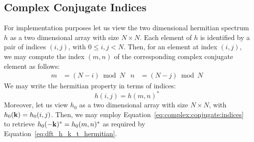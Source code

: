 \subsection{Complex Conjugate Indices}
%
For implementation purposes let us view the two dimensional hermitian spectrum $h$
as a two dimensional array with size $N \times N$.
Each element of $h$ is identified by a pair of indices $(i,j)$, with $0\leq i,j <N$. Then, for
an element at index $(i,j)$, we may compute the index $(m,n)$ of the corresponding complex
conjugate element as follows:
\begin{align}
\label{eq:complex:conjugate:indices}
m &= (N - i)\bmod N & n &= (N - j)\bmod N
\end{align}
We may write the hermitian property in terms of indices:
\begin{equation*}
 h(i,j) = h(m,n)^*
\end{equation*}
%
Moreover, let us view $h_0$ as a two dimensional array with size $N \times N$,
with $h_0(\mathbf{k}) = h_0(i,j)$. Then, we may employ Equation~\ref{eq:complex:conjugate:indices}
to retrieve $h_0(-\mathbf{k})^*=h_0(m,n)^*$ as required by
Equation~\ref{eq:dft_h_k_t_hermitian}.
%

%

%
